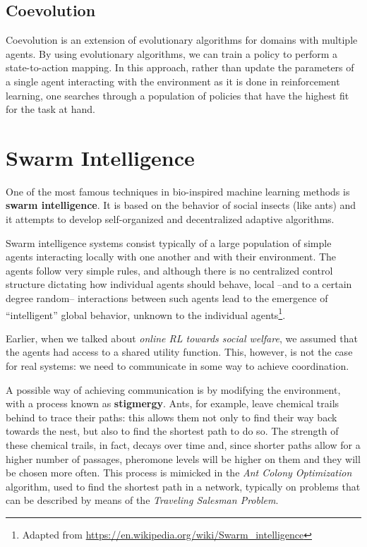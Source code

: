\subsection{Coevolution}
Coevolution is an extension of evolutionary algorithms for domains with multiple agents. By using evolutionary algorithms, we can train a policy to perform a state-to-action mapping. In this approach, rather than update the parameters of a single agent interacting with the environment as it is done in reinforcement learning, one searches through a population of policies that have the highest fit for the task at hand.

\section{Swarm Intelligence}
One of the most famous techniques in bio-inspired machine learning methods is \textbf{swarm intelligence}. It is based on the behavior of social insects (like ants) and it attempts to develop self-organized and decentralized adaptive algorithms.

Swarm intelligence systems consist typically of a large population of simple agents interacting locally with one another and with their environment. The agents follow very simple rules, and although there is no centralized control structure dictating how individual agents should behave, local --and to a certain degree random-- interactions between such agents lead to the emergence of ``intelligent'' global behavior, unknown to the individual agents\footnote{Adapted from \url{https://en.wikipedia.org/wiki/Swarm_intelligence}}.

Earlier, when we talked about \textit{online RL towards social welfare}, we assumed that the agents had access to a shared utility function. This, however, is not the case for real systems: we need to communicate in some way to achieve coordination. 

A possible way of achieving communication is by modifying the environment, with a process known as \textbf{stigmergy}. Ants, for example, leave chemical trails behind to trace their paths: this allows them not only to find their way back towards the nest, but also to find the shortest path to do so. The strength of these chemical trails, in fact, decays over time and, since shorter paths allow for a higher number of passages, pheromone levels will be higher on them and they will be chosen more often. This process is mimicked in the \textit{Ant Colony Optimization} algorithm, used to find the shortest path in a network, typically on problems that can be described by means of the \textit{Traveling Salesman Problem}.

